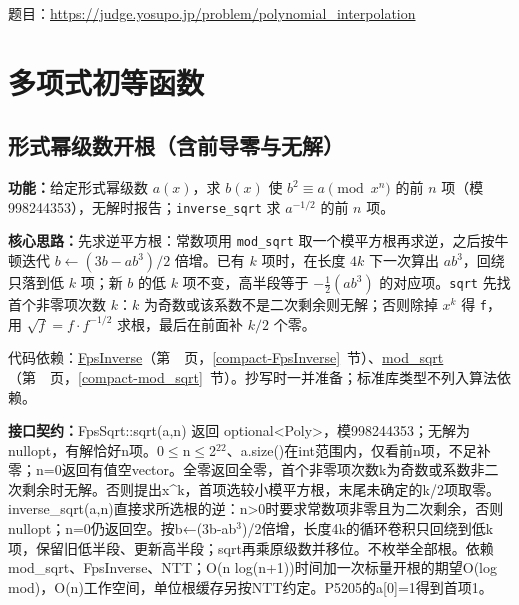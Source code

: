 题目：\url{https://judge.yosupo.jp/problem/polynomial_interpolation}



\newpage

\section{多项式初等函数}

\subsection{形式幂级数开根（含前导零与无解）}\label{compact-FpsSqrt}

\noindent\textbf{功能：}\allowbreak 给定形式幂级数 $a(x)$，求 $b(x)$ 使 $b^2\equiv a\pmod{x^n}$ 的前 $n$ 项（模 998244353），无解时报告；\texttt{inverse\_sqrt} 求 $a^{-1/2}$ 的前 $n$ 项。

\textbf{核心思路：}\allowbreak 先求逆平方根：常数项用 \texttt{mod\_sqrt} 取一个模平方根再求逆，之后按牛顿迭代 $b\leftarrow(3b-ab^3)/2$ 倍增。已有 $k$ 项时，在长度 $4k$ 下一次算出 $ab^3$，回绕只落到低 $k$ 项；新 $b$ 的低 $k$ 项不变，高半段等于 $-\frac12(ab^3)$ 的对应项。\texttt{sqrt} 先找首个非零项次数 $k$：$k$ 为奇数或该系数不是二次剩余则无解；否则除掉 $x^k$ 得 \texttt{f}，用 $\sqrt f=f\cdot f^{-1/2}$ 求根，最后在前面补 $k/2$ 个零。

代码依赖：\hyperref[compact-FpsInverse]{FpsInverse}（第~\pageref{compact-FpsInverse}~页，\ref{compact-FpsInverse}~节）、\hyperref[compact-mod_sqrt]{mod\_\allowbreak{}sqrt}（第~\pageref{compact-mod_sqrt}~页，\ref{compact-mod_sqrt}~节）。抄写时一并准备；标准库类型不列入算法依赖。

{\sloppy{}\noindent\textbf{接口契约：}FpsSqrt::sqrt(a,n) 返回 optional<Poly>，模998244353；无解为nullopt，有解恰好n项。0$\le$n$\le$2$^{22}$、a.size()在int范围内，仅看前n项，不足补零；n=0返回有值空vector。全零返回全零，首个非零项次数k为奇数或系数非二次剩余时无解。否则提出x\textasciicircum{}k，首项选较小模平方根，末尾未确定的k/2项取零。inverse\_sqrt(a,n)直接求所选根的逆：n>0时要求常数项非零且为二次剩余，否则nullopt；n=0仍返回空。按b←(3b-ab$^{3}$)/2倍增，长度4k的循环卷积只回绕到低k项，保留旧低半段、更新高半段；sqrt再乘原级数并移位。不枚举全部根。依赖mod\_sqrt、FpsInverse、NTT；O(n log(n+1))时间加一次标量开根的期望O(log mod)，O(n)工作空间，单位根缓存另按NTT约定。P5205的a[0]=1得到首项1。\par}

\Needspace{492pt}

